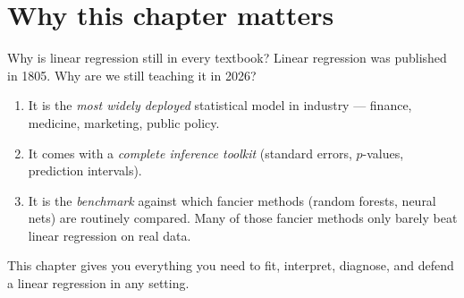 \documentclass[aspectratio=169,11pt]{beamer}
\begin{document}
\section{Why this chapter matters}

\begin{frame}{Why is linear regression still in every textbook?}
  Linear regression was published in 1805. Why are we still teaching it
  in 2026?
  \begin{takeaway}
    \begin{enumerate}
      \item It is the \emph{most widely deployed} statistical model in
            industry --- finance, medicine, marketing, public policy.
      \item It comes with a \emph{complete inference toolkit} (standard
            errors, $p$-values, prediction intervals).
      \item It is the \emph{benchmark} against which fancier methods
            (random forests, neural nets) are routinely compared. Many
            of those fancier methods only barely beat linear
            regression on real data.
    \end{enumerate}
  \end{takeaway}
  This chapter gives you everything you need to fit, interpret,
  diagnose, and defend a linear regression in any setting.
\end{frame}
\end{document}
